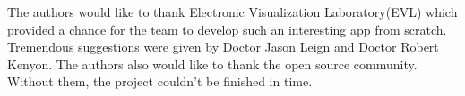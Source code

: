 \documentclass[conference]{IEEEtran}
\begin{document}
The authors would like to thank Electronic Visualization Laboratory(EVL)  which provided a chance for the team to develop such an interesting app from scratch. Tremendous suggestions were given by Doctor Jason Leign and Doctor Robert Kenyon. The authors also would like to thank the open source community. Without them, the project couldn't be finished in time.





%
%
% 




\end{document}
